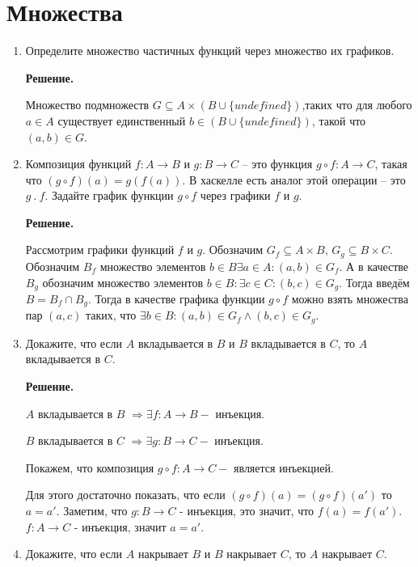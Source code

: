 \section{Множества}
\begin{enumerate}

\item Определите множество частичных функций через множество их графиков.

\textbf{Решение.} 

Множество подмножеств $G \subseteq A \times (B \cup \{undefined\})$,таких что для любого $a \in A$ существует 
единственный $b \in (B \cup \{undefined\})$, такой что $(a, b) \in G$.

\item Композиция функций $f : A \to B$ и $g : B \to C$ -- это функция $g \circ f : A \to C$, такая что $(g 
\circ f)(a) = g(f(a))$.
    В хаскелле есть аналог этой операции -- это $g\ .\ f$. Задайте график функции $g \circ f$ через графики 
    $f$ и $g$.

\textbf{Решение.} 

Рассмотрим графики функций $f$ и $g$. Обозначим $G_f \subseteq A \times B$, $G_g \subseteq B \times C$. 
Обозначим $B_f$ множество элементов $b \in B \exists a \in A : (a, b) \in G_f$. А в качестве $B_g$ обозначим 
множество элементов $b\in B : \exists c \in C : (b, c) \in G_g$. Тогда введём $B = B_f \cap B_g$. Тогда в 
качестве графика функции $g \circ f$ можно взять множества пар $(a, c)$ таких, что $\exists b \in B : (a, b) 
\in G_f \land (b, c) \in G_g$.  

\item Докажите, что если $A$ вкладывается в $B$ и $B$ вкладывается в $C$, то $A$ вкладывается в $C$.

\textbf{Решение.} 

$A$ вкладывается в $B$ $\Rightarrow \exists f:A\rightarrow B - $ инъекция.

$B$ вкладывается в $C$ $\Rightarrow \exists g:B\rightarrow C - $ инъекция.

Покажем, что композиция $g \circ f : A\rightarrow C - $ является инъекцией.

Для этого достаточно показать, что если $(g \circ f)(a) = (g \circ f)(a')$ то $a = a'$. Заметим, что 
$g:B\rightarrow C$ - инъекция, это значит, что $f(a) = f(a')$. $f:A\rightarrow C$ - инъекция, значит $a = a'$.

\item Докажите, что если $A$ накрывает $B$ и $B$ накрывает $C$, то $A$ накрывает $C$.


\end{enumerate}
